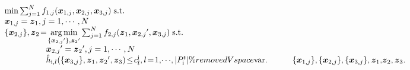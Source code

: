 \documentclass[letterpaper]{article} %
\begin{document}
\begin{equation}
\label{eq:4}
\begin{array}{l}
\min \sum\nolimits_{j = 1}^N {{f_{1,j}}({\boldsymbol{x}_{1,j}},{\boldsymbol{x}_{2,j}},{\boldsymbol{x}_{3,j}})} \;{\rm{s}}.{\rm{t}}. \\

{\boldsymbol{x}_{1,j}} = {\boldsymbol{z}_1},j = 1, \cdots ,N \\

\{ {\boldsymbol{x}_{2,j}}\} ,{\boldsymbol{z}_2} \!=\! \mathop {\arg \min }\limits_{\{ {\boldsymbol{x}_{2,j}}'\} ,{\boldsymbol{z}_2}'} \sum\nolimits_{j = 1}^N {{f_{2,j}}({\boldsymbol{z}_1},{\boldsymbol{x}_{2,j}}',{\boldsymbol{x}_{3,j}})} \;{\rm{s}}.{\rm{t}}. \\

\qquad \qquad \quad   {\boldsymbol{x}_{2,j}}' = {\boldsymbol{z}_2}',j = 1, \cdots ,N \\

\qquad \qquad \quad   \hat{h}_{{\rm{\uppercase\expandafter{\romannumeral1}}},l}(\{{\boldsymbol{x}_{3,j}}\},\boldsymbol{z}_1, {\boldsymbol{z}_2}',\boldsymbol{z}_3 )  \!\le\! c_l^{\rm{\uppercase\expandafter{\romannumeral1}}},l \!=\! 1,\! \cdots\! ,|P_{\rm{\uppercase\expandafter{\romannumeral1}}}^{t}|\%removedVspace

{\mathop{\rm var}}. \qquad  \quad \{{\boldsymbol{x}_{1,j}}\} ,{\rm{\{ }}{\boldsymbol{x}_{2,j}}\} ,{\rm{\{ }}{\boldsymbol{x}_{3,j}}\} ,{\boldsymbol{z}_1}{\rm{,}}{\boldsymbol{z}_2},{\boldsymbol{z}_3}.
\end{array}
\end{equation}
\end{document}
